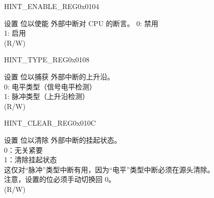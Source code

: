 \begin{register}{H}{INT\_ENABLE\_REG}{0x0104}\label{regdesc:INTENABLEREG}
%
%
%
%
%
%
\regnewline%
\begin{regdesc}
\begin{reglist}
\item [INT\_ENABLE\lbrack\regindex{n}\rbrack] 设置  位以使能  外部中断对 CPU 的断言。
0: 禁用\\
1: 启用\\
(R/W)
\end{reglist}
\end{regdesc}
\end{register}

\begin{register}{H}{INT\_TYPE\_REG}{0x0108}\label{regdesc:INTTYPEREG}
%
%
%
%
%
%
\regnewline%
\begin{regdesc}
\begin{reglist}
\item [INT\_TYPE\lbrack\regindex{n}\rbrack] 设置  位以捕获  外部中断的上升沿。\\
0: 电平类型（信号电平检测）\\
1: 脉冲类型（上升沿检测）\\
(R/W)
\end{reglist}
\end{regdesc}
\end{register}

\begin{register}{H}{INT\_CLEAR\_REG}{0x010C}\label{regdesc:INTCLEARREG}
%
%
%
%
%
%
\regnewline%
\begin{regdesc}
\begin{reglist}
\item [INT\_CLEAR\lbrack\regindex{n}\rbrack] 设置  位以清除  外部中断的挂起状态。\\
0：无关紧要\\
1：清除挂起状态\\
这仅对“脉冲”类型中断有用，因为“电平”类型中断必须在源头清除。\\
注意，设置的位必须手动切换回 0。\\
(R/W)
\end{reglist}
\end{regdesc}
\end{register}

